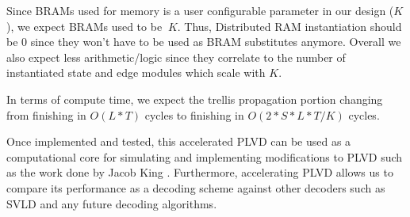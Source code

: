 Since BRAMs used for memory is a user configurable parameter in our design ($K$), we expect BRAMs used to be $~K$. Thus, Distributed RAM instantiation should be 0 since they won't have to be used as BRAM substitutes anymore. Overall we also expect less arithmetic/logic since they correlate to the number of instantiated state and edge modules which scale with $K$. 

In terms of compute time, we expect the trellis propagation portion changing from finishing in $O(L*T)$ cycles to finishing in $O(2*S*L*T/K)$ cycles.

Once implemented and tested, this accelerated PLVD can be used as a computational core for simulating and implementing modifications to PLVD such as the work done by Jacob King \cite{king2023design}. Furthermore, accelerating PLVD allows us to compare its performance as a decoding scheme against other decoders such as SVLD and any future decoding algorithms.


